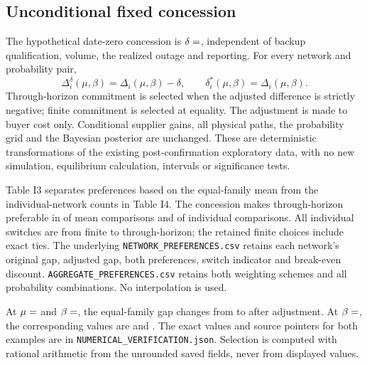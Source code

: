 \documentclass[preprint,11pt,authoryear]{elsarticle}
\begin{document}
\clearpage
\subsection{Unconditional fixed concession}
The hypothetical date-zero concession is $\delta=\fd{delta}$, independent of backup qualification, volume, the realized outage and reporting. For every network and probability pair,
\[
 \Delta_i^\delta(\mu,\beta)=\Delta_i(\mu,\beta)-\delta,
 \qquad \delta_i^*(\mu,\beta)=\Delta_i(\mu,\beta).
\]
Through-horizon commitment is selected when the adjusted difference is strictly negative; finite commitment is selected at equality. The adjustment is made to buyer cost only. Conditional supplier gains, all physical paths, the probability grid and the Bayesian posterior are unchanged. These are deterministic transformations of the existing post-confirmation exploratory data, with no new simulation, equilibrium calculation, intervals or significance tests.

Table I3 separates preferences based on the equal-family mean from the individual-network counts in Table I4. The concession makes through-horizon preferable in  of  mean comparisons and  of  individual comparisons. All  individual switches are from finite to through-horizon; the  retained finite choices include  exact ties. The underlying \texttt{NETWORK\_PREFERENCES.csv} retains each network's original gap, adjusted gap, both preferences, switch indicator and break-even discount. \texttt{AGGREGATE\_PREFERENCES.csv} retains both weighting schemes and all probability combinations. No interpolation is used.

At $\mu=\xa{mu2}$ and $\beta=\xa{beta0}$, the equal-family gap changes from  to  after adjustment. At $\beta=\xa{beta4}$, the corresponding values are  and . The exact values and source pointers for both examples are in \texttt{NUMERICAL\_VERIFICATION.json}. Selection is computed with rational arithmetic from the unrounded saved fields, never from displayed values.
\end{document}
